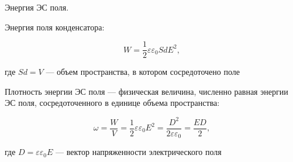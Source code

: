 Энергия ЭС поля.

Энергия поля конденсатора:

$$
W=\frac{1}{2}\varepsilon\varepsilon_0SdE^2,
$$

где $Sd=V$ — объем пространства, в котором сосредоточено поле

Плотность энергии ЭС поля — физическая величина, численно равная энергии ЭС поля, сосредоточенного в единице объема пространства:

$$
\omega=\frac{W}{V}=\frac{1}{2}\varepsilon\varepsilon_0E^2=\frac{D^2}{2\varepsilon\varepsilon_0}=\frac{ED}{2},
$$

где $D=\varepsilon\varepsilon_0E$ — вектор напряженности электрического поля
